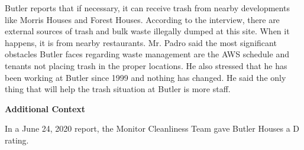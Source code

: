 Butler reports that if necessary, it can receive trash from nearby developments like Morris Houses and Forest Houses.  According to the interview, there are external sources of trash and bulk waste illegally dumped at this site. When it happens, it is from nearby restaurants. Mr. Padro said the most significant obstacles Butler faces regarding waste management are the AWS schedule and tenants not placing trash in the proper locations. He also stressed that he has been working at Butler since 1999 and nothing has changed. He said the only thing that will help the trash situation at Butler is more staff.

\textbf{Additional Context}  

In a June 24, 2020 report, the Monitor Cleanliness Team gave Butler Houses a D rating.  

 